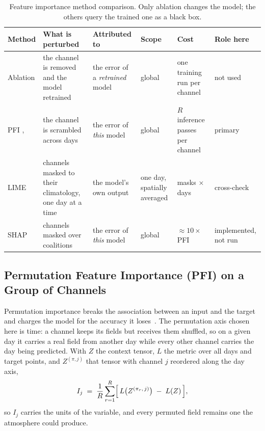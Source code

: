 \begin{table}[htbp]
\centering
\caption[Feature importance method comparison]{Feature importance method comparison. Only ablation changes the model; the others query the trained one as a black box.}
\label{tab:meth-fi-methods}
\footnotesize
\setlength{\tabcolsep}{4pt}
\begin{tabular}{|p{1.5cm}|p{2.5cm}|p{2.5cm}|p{2.0cm}|p{2.0cm}|p{2.0cm}|}
\hline
\textbf{Method} & \textbf{What is perturbed} & \textbf{Attributed to} & \textbf{Scope} & \textbf{Cost} & \textbf{Role here} \\
\hline
Ablation \mbox{\cite{meyes2019ablation}} & the channel is removed and the model retrained & the error of a \emph{retrained} model & global & one training run per channel & not used \\
\hline
PFI \mbox{\cite{breiman2001rf}}, \mbox{\cite{fisher2019allmodels}} & the channel is scrambled across days & the error of \emph{this} model & global & $R$ inference passes per channel & primary \\
\hline
LIME \mbox{\cite{ribeiro2016lime}} & channels masked to their climatology, one day at a time & the model's own output & one day, spatially averaged & masks $\times$ days & cross-check \\
\hline
SHAP \mbox{\cite{lundberg2017shap}} & channels masked over coalitions & the error of \emph{this} model & global & ${\approx}10\times$ PFI & implemented, not run \\
\hline
\end{tabular}
\end{table}

\subsection{Permutation Feature Importance (PFI) on a Group of Channels}\label{subsec:meth-fi-groups}\label{subsec:meth-fi-pfi}

Permutation importance breaks the association between an input and the target and charges the model
for the accuracy it loses~\cite{breiman2001rf,fisher2019allmodels}. The
permutation axis chosen here is time: a channel keeps its fields but receives them shuffled, so on a given
day it carries a real field from another day while every other channel carries the day being
predicted. With $Z$ the context tensor, $L$ the
metric over all days and target points, and $Z^{(\pi, j)}$ that tensor with channel $j$ reordered
along the day axis,
\begin{equation}
I_j \;=\; \frac{1}{R} \sum_{r=1}^{R} \Bigl[\, L\bigl(Z^{(\pi_r,\, j)}\bigr) \;-\; L(Z) \,\Bigr],
\label{eq:pfi}
\end{equation}
so $I_j$ carries the units of the variable, and every permuted field remains one the atmosphere could
produce.

